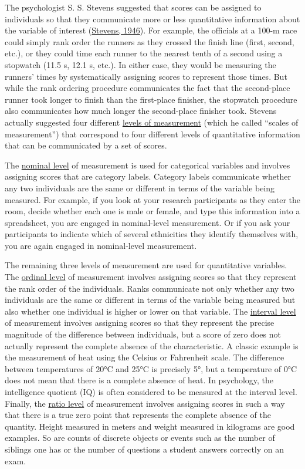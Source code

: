 \documentclass[
]{krantz}
\begin{document}
The psychologist S. S. Stevens suggested that scores can be assigned to individuals so that they communicate more or less quantitative information about the variable of interest (\protect\hyperlink{ref-stevens1946theory}{Stevens, 1946}). For example, the officials at a 100-m race could simply rank order the runners as they crossed the finish line (first, second, etc.), or they could time each runner to the nearest tenth of a second using a stopwatch (11.5 s, 12.1 s, etc.). In either case, they would be measuring the runners' times by systematically assigning scores to represent those times. But while the rank ordering procedure communicates the fact that the second-place runner took longer to finish than the first-place finisher, the stopwatch procedure also communicates how much longer the second-place finisher took. Stevens actually suggested four different \protect\hyperlink{levels-of-measurement-1}{levels of measurement} (which he called ``scales of measurement'') that correspond to four different levels of quantitative information that can be communicated by a set of scores.

The \protect\hyperlink{nominal-level}{nominal level} of measurement is used for categorical variables and involves assigning scores that are category labels. Category labels communicate whether any two individuals are the same or different in terms of the variable being measured. For example, if you look at your research participants as they enter the room, decide whether each one is male or female, and type this information into a spreadsheet, you are engaged in nominal-level measurement. Or if you ask your participants to indicate which of several ethnicities they identify themselves with, you are again engaged in nominal-level measurement.

The remaining three levels of measurement are used for quantitative variables. The \protect\hyperlink{ordinal-level}{ordinal level} of measurement involves assigning scores so that they represent the rank order of the individuals. Ranks communicate not only whether any two individuals are the same or different in terms of the variable being measured but also whether one individual is higher or lower on that variable. The \protect\hyperlink{interval-level}{interval level} of measurement involves assigning scores so that they represent the precise magnitude of the difference between individuals, but a score of zero does not actually represent the complete absence of the characteristic. A classic example is the measurement of heat using the Celsius or Fahrenheit scale. The difference between temperatures of 20°C and 25°C is precisely 5°, but a temperature of 0°C does not mean that there is a complete absence of heat. In psychology, the intelligence quotient (IQ) is often considered to be measured at the interval level. Finally, the \protect\hyperlink{ratio-level}{ratio level} of measurement involves assigning scores in such a way that there is a true zero point that represents the complete absence of the quantity. Height measured in meters and weight measured in kilograms are good examples. So are counts of discrete objects or events such as the number of siblings one has or the number of questions a student answers correctly on an exam.
\end{document}
